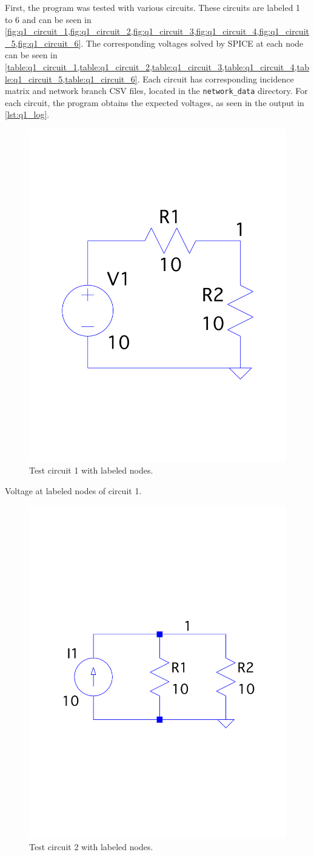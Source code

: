 \documentclass[a4paper,titlepage]{article}
\begin{document}
	First, the program was tested with various circuits. These circuits are labeled 1 to 6 and can be seen in \cref{fig:q1_circuit_1,fig:q1_circuit_2,fig:q1_circuit_3,fig:q1_circuit_4,fig:q1_circuit_5,fig:q1_circuit_6}. The corresponding voltages solved by SPICE at each node can be seen in \cref{table:q1_circuit_1,table:q1_circuit_2,table:q1_circuit_3,table:q1_circuit_4,table:q1_circuit_5,table:q1_circuit_6}. Each circuit has corresponding incidence matrix and network branch CSV files, located in the \texttt{network_data} directory. For each circuit, the program obtains the expected voltages, as seen in the output in \autoref{lst:q1_log}.
	
	
	\begin{figure}[!htb]
		\centering
		\includegraphics[width=0.5\columnwidth]{plots/q1_circuit_1.pdf}
		\caption
		{Test circuit 1 with labeled nodes.}
		\label{fig:q1_circuit_1}
	\end{figure}

	\begin{table}[!htb]
		\centering
		\caption{Voltage at labeled nodes of circuit 1.}
		\label{table:q1_circuit_1}
	\end{table}

	\begin{figure}[!htb]
		\centering
		\includegraphics[width=0.5\columnwidth]{plots/q1_circuit_2.pdf}
		\caption
		{Test circuit 2 with labeled nodes.}
		\label{fig:q1_circuit_2}
	\end{figure}
	
\end{document}
